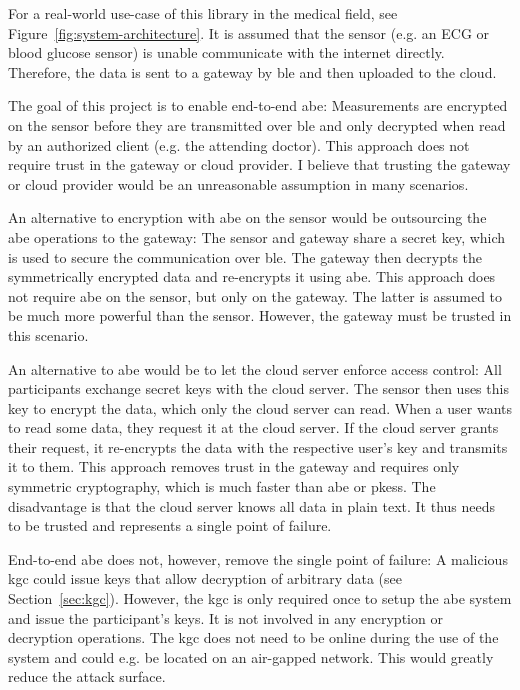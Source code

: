 For a real-world use-case of this library in the medical field, see Figure~\ref{fig:system-architecture}.
It is assumed that the sensor (e.g. an ECG or blood glucose sensor) is unable communicate with the internet directly.
Therefore, the data is sent to a gateway by \acrfull{ble} and then uploaded to the cloud.

The goal of this project is to enable end-to-end \acrlong{abe}:
Measurements are encrypted on the sensor before they are transmitted over \acrshort{ble} and only decrypted when read by an authorized client (e.g. the attending doctor).
This approach does not require trust in the gateway or cloud provider.
I believe that trusting the gateway or cloud provider would be an unreasonable assumption in many scenarios.

An alternative to encryption with \acrshort{abe} on the sensor would be outsourcing the \acrshort{abe} operations to the gateway:
The sensor and gateway share a secret key, which is used to secure the communication over \acrshort{ble}.
The gateway then decrypts the symmetrically encrypted data and re-encrypts it using \acrshort{abe}.
This approach does not require \acrshort{abe} on the sensor, but only on the gateway.
The latter is assumed to be much more powerful than the sensor.
However, the gateway must be trusted in this scenario.

An alternative to \acrshort{abe} would be to let the cloud server enforce access control:
All participants exchange secret keys with the cloud server.
The sensor then uses this key to encrypt the data, which only the cloud server can read.
When a user wants to read some data, they request it at the cloud server.
If the cloud server grants their request, it re-encrypts the data with the respective user's key and transmits it to them.
This approach removes trust in the gateway and requires only symmetric cryptography, which is much faster than \acrshort{abe} or \glspl{pkes}.
The disadvantage is that the cloud server knows all data in plain text. It thus needs to be trusted and represents a single point of failure.

End-to-end \acrshort{abe} does not, however, remove the single point of failure:
A malicious \acrfull{kgc} could issue keys that allow decryption of arbitrary data (see Section~\ref{sec:kgc}).
However, the \acrfull{kgc} is only required once to setup the \acrshort{abe} system and issue the participant's keys.
It is not involved in any encryption or decryption operations.
The \acrshort{kgc} does not need to be online during the use of the system and could e.g. be located on an air-gapped network. 
This would greatly reduce the attack surface.
~\\

